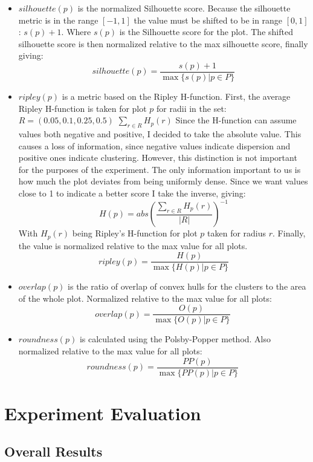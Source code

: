 \documentclass[11pt]{article}
\begin{document}
\begin{itemize}
\item \(silhouette(p)\) is the normalized Silhouette score. Because the silhouette metric is in the range \([-1, 1]\) the value must be shifted to be in range \([0, 1]\): \(s(p) + 1\). Where \(s(p)\) is the Silhouette score for the plot. The shifted silhouette score is then normalized relative to the max silhouette score, finally giving:
\[silhouette(p) = \frac{s(p) + 1}{\max\{s(p) | p \in P\}}\]
\item \(ripley(p)\) is a metric based on the Ripley H-function. First, the average Ripley H-function is taken for plot \(p\) for radii in the set: \(R = (0.05, 0.1, 0.25, 0.5)\) \(\sum_{r \in R} H_{p}(r)\) Since the H-function can assume values both negative and positive, I decided to take the absolute value. This causes a loss of information, since negative values indicate dispersion and positive ones indicate clustering. However, this distinction is not important for the purposes of the experiment. The only information important to us is how much the plot deviates from being uniformly dense. Since we want values close to 1 to indicate a better score I take the inverse, giving:
\[H(p) = abs(\frac{\sum_{r \in R} H_{p}(r)}{|R|})^{-1}\]
With \(H_{p}(r)\) being Ripley's H-function for plot \(p\) taken for radius \(r\). Finally, the value is normalized relative to the max value for all plots.
\[ ripley(p) = \frac{H(p)}{ \max \{ H(p)| p \in P \}} \]
\item \(overlap(p)\) is the ratio of overlap of convex hulls for the clusters to the area of the whole plot. Normalized relative to the max value for all plots:
\[ overlap(p) = \frac{O(p)}{ \max \{ O(p)| p \in P \}} \  \]
\item \(roundness(p)\) is calculated using the Polsby-Popper method. Also normalized relative to the max value for all plots:
\[ roundness(p) = \frac{PP(p)}{ \max \{ PP(p)| p \in P \}} \  \]
\end{itemize}

\pagebreak

\section{Experiment Evaluation}
\label{sec:org8d9a4f0}
\subsection{Overall Results}
\label{sec:org5ce221c}
\end{document}
